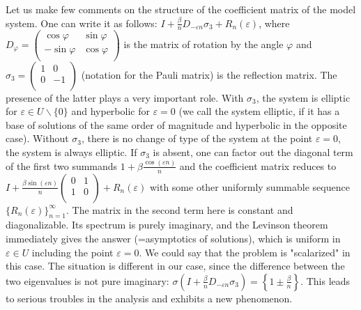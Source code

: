 \documentclass[a4paper,oneside,12pt]{amsart}
\begin{document}
Let us make few comments on the structure of the coefficient matrix of the model system. One can write it as follows:
$I+\frac{\beta}nD_{-\varepsilon n}\sigma_3+R_n(\varepsilon)$,
where $D_{\varphi}=
\left(
  \begin{array}{cc}
    \cos\varphi & \sin\varphi \\
    -\sin\varphi & \cos\varphi \\
  \end{array}
\right)$ is the matrix of rotation by the angle $\varphi$ and
$\sigma_3=
\left(
  \begin{array}{cc}
    1 & 0 \\
    0 & -1 \\
  \end{array}
\right)$ (notation for the Pauli matrix) is the reflection matrix. The presence of the latter plays a very important role. With $\sigma_3$, the system is elliptic for $\varepsilon\in U\backslash\{0\}$ and hyperbolic for $\varepsilon=0$ (we call the system elliptic, if it has a base of solutions of the same order of magnitude and hyperbolic in the opposite case). Without $\sigma_3$, there is no change of type of the system at the point $\varepsilon=0$, the system is always elliptic. If $\sigma_3$ is absent, one can factor out the diagonal term of the first two summands $1+\beta\frac{\cos(\varepsilon n)}n$ and the coefficient matrix reduces to
$I+\frac{\beta\sin(\varepsilon n)}n
\left(
\begin{array}{cc}
0 & 1 \\
1 & 0 \\
\end{array}
\right)
+R_n(\varepsilon)$ with some other uniformly summable sequence $\{R_n(\varepsilon)\}_{n=1}^{\infty}$. The matrix in the second term here is constant and diagonalizable. Its spectrum is purely imaginary, and the Levinson theorem immediately gives the answer (=asymptotics of solutions), which is uniform in $\varepsilon\in U$ including the point $\varepsilon=0$. We could say that the problem is "scalarized" in this case. The situation is different in our case, since the difference between the two eigenvalues is not pure imaginary: $\sigma\left(I+\frac{\beta}nD_{-\varepsilon n}\sigma_3\right)=\left\{1\pm\frac{\beta}n\right\}$. This leads to serious troubles in the analysis and exhibits a new phenomenon.
\end{document}

